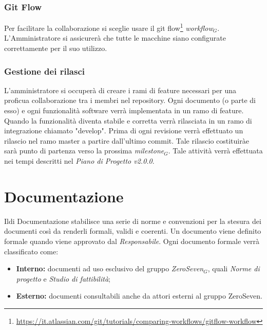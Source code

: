\subsubsection{Git Flow}
Per facilitare la collaborazione si sceglie usare il git flow\footnote{\url{https://it.atlassian.com/git/tutorials/comparing-workflows/gitflow-workflow}} \textit{workflow$_{G}$}. L'Amministratore si assicurerà che tutte le macchine siano configurate correttamente per il suo utilizzo.
\subsubsection{Gestione dei rilasci}
L'amministratore si occuperà di creare i rami di feature necessari per una proficua collaborazione tra i membri nel repository. Ogni documento (o parte di esso) e ogni funzionalità software verrà implementata in un ramo di feature. Quando la funzionalità diventa stabile e corretta verrà rilasciata in un ramo di integrazione chiamato "develop". Prima di ogni revisione verrà effettuato un rilascio nel ramo master a partire dall'ultimo commit. Tale rilascio costituiràe sarà punto di partenza verso la prossima \textit{milestone$_{G}$}. Tale attività verrà effettuata nei tempi descritti nel \textit{Piano di Progetto v2.0.0}. 

\section{Documentazione}
Ildi Documentazione stabilisce una serie di norme e convenzioni per la stesura dei documenti così da renderli formali, validi e coerenti.
Un documento viene definito formale quando viene approvato dal \textit{Responsabile}.
Ogni documento formale verrà classificato come:
\begin{itemize}
	\item \textbf{Interno:} documenti ad uso esclusivo del gruppo \textit{ZeroSeven$_{G}$}, quali \textit{Norme di progetto} e \textit{Studio di fattibilità};
	\item \textbf{Esterno:} documenti consultabili anche da attori esterni al gruppo ZeroSeven.
	
\end{itemize}


